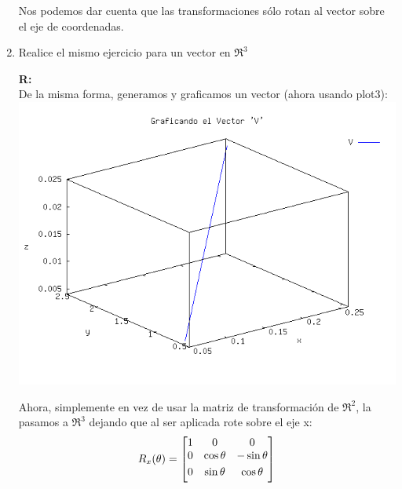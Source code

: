 \begin{enumerate}
		Nos podemos dar cuenta que las transformaciones sólo rotan al vector sobre el eje de
		coordenadas.
		\newpage
	\item Realice el mismo ejercicio para un vector en $\Re^3$

		\textbf{R:}\\

		De la misma forma, generamos y graficamos un vector (ahora usando plot3):\\
		\includegraphics[scale=0.6]{imagenes/3_v3.png}

		Ahora, simplemente en vez de usar la matriz de transformación de $\Re^2$, la pasamos a
		$\Re^3$ dejando que al ser aplicada rote sobre el eje x:
		\[
		R_x(\theta) = \begin{bmatrix} 1 & 0 & 0 \\ 0 & \cos \theta	& -\sin \theta \\[3pt] 0 & \sin \theta  & \cos \theta \\[3pt] \end{bmatrix}\\[6pt] 
		\]


\end{enumerate}
